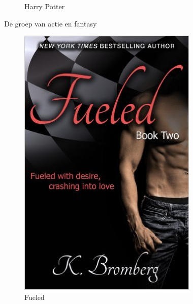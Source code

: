\documentclass[11pt,a4paper]{article}
\begin{document}
\begin{figure}[H]
\begin{subfigure}{0.33\textwidth}
\caption{Harry Potter}
\end{subfigure}
\caption{De groep van actie en fantasy}
\end{figure}

\begin{figure}[H]
\begin{subfigure}{0.33\textwidth}
\centering
\includegraphics[width=.8\linewidth]{dune83}
\caption{Fueled}
\end{subfigure}
\begin{subfigure}{0.33\textwidth}
\centering

\end{subfigure}
\end{figure}
\end{document}
